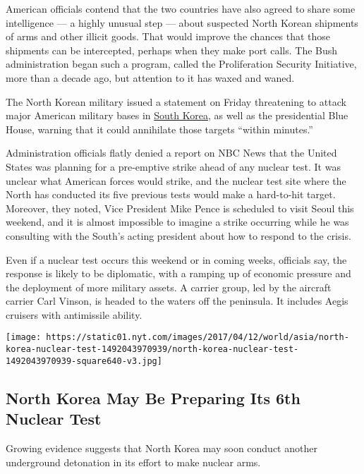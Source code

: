 American officials contend that the two countries have also agreed to
share some intelligence --- a highly unusual step --- about suspected
North Korean shipments of arms and other illicit goods. That would
improve the chances that those shipments can be intercepted, perhaps
when they make port calls. The Bush administration began such a program,
called the Proliferation Security Initiative, more than a decade ago,
but attention to it has waxed and waned.

The North Korean military issued a statement on Friday threatening to
attack major American military bases in
\href{https://www.nytimes.com/topic/destination/south-korea?8qa}{South
Korea}, as well as the presidential Blue House, warning that it could
annihilate those targets ``within minutes.''

Administration officials flatly denied a report on NBC News that the
United States was planning for a pre-emptive strike ahead of any nuclear
test. It was unclear what American forces would strike, and the nuclear
test site where the North has conducted its five previous tests would
make a hard-to-hit target. Moreover, they noted, Vice President Mike
Pence is scheduled to visit Seoul this weekend, and it is almost
impossible to imagine a strike occurring while he was consulting with
the South's acting president about how to respond to the crisis.

Even if a nuclear test occurs this weekend or in coming weeks, officials
say, the response is likely to be diplomatic, with a ramping up of
economic pressure and the deployment of more military assets. A carrier
group, led by the aircraft carrier Carl Vinson, is headed to the waters
off the peninsula. It includes Aegis cruisers with antimissile ability.

\href{https://www.nytimes.com/interactive/2017/04/12/world/asia/north-korea-nuclear-test.html}{}

\texttt{[image: https://static01.nyt.com/images/2017/04/12/world/asia/north-korea-nuclear-test-1492043970939/north-korea-nuclear-test-1492043970939-square640-v3.jpg]}

\hypertarget{north-korea-may-be-preparing-its-6th-nuclear-test}{%
\subsection{North Korea May Be Preparing Its 6th Nuclear
Test}\label{north-korea-may-be-preparing-its-6th-nuclear-test}}

Growing evidence suggests that North Korea may soon conduct another
underground detonation in its effort to make nuclear arms.

